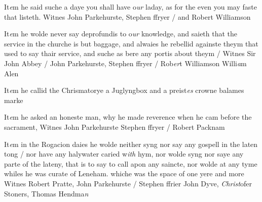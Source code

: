 \documentclass[12pt, a4paper]{book}
\begin{document}
		\ifthenelse{\isodd{\thepage}}
		{\reversemarginpar}
		{\normalmarginpar}
		It\textit{e}m he said suche a daye you shall have o\textit{ur} laday, as for the even
 	you may faste that listeth. Witnes John Parkehurste, Stephen
 		ffryer / and Robert Williamson
	
		
				\marginpar[\vspace{0.5cm}{\textcolor{Gray}{Anno 1542}}]{}
			
		
				\marginpar[\vspace{0.5cm}{\textcolor{Gray}{offensive}}]{}
			
	
		\ifthenelse{\isodd{\thepage}}
		{\reversemarginpar}
		{\normalmarginpar}
		It\textit{e}m he wolde never say deprofundis to o\textit{ur} knowledge, and saieth
  that the service in the churche is but baggage, and alwaies
 he rebellid againste theym that used to say thair service, and
 suche as bere any portis about theym / Witnes Sir John
 	Abbey / John Parkehurste, Stephen ffryer / Rob\textit{er}t Williamson
		Willi\textit{a}m Alen
	
 
				\marginpar[\vspace{0.5cm}{\textcolor{Gray}{Anno 1540}}]{}
			
	
				\marginpar[\vspace{0.5cm}{\textcolor{Gray}{seditious}}]{}
			
	
				\marginpar[\vspace{0.5cm}{\textcolor{Gray}{vi articles}}]{}
			
	
		\ifthenelse{\isodd{\thepage}}
		{\reversemarginpar}
		{\normalmarginpar}
		It\textit{e}m he callid the Chrismatorye a Juglyngbox and a preist\textit{es}
  crowne balames marke
  
		\ifthenelse{\isodd{\thepage}}
		{\reversemarginpar}
		{\normalmarginpar}
		It\textit{e}m he asked an honeste man, why he made reverence when
  	he cam before the sacrament, Witnes John Parkehurste
  	Stephen ffryer / Robert Packnam
	
 
 	
				\marginpar[\vspace{0.5cm}{\textcolor{Gray}{ceremonies}}]{}
			
	
		\ifthenelse{\isodd{\thepage}}
		{\reversemarginpar}
		{\normalmarginpar}
		It\textit{e}m in the Rogacion daies he wolde neither syng nor say any gospell
 in the laten tong / nor have any halywater caried w\textit{ith} hym, nor
 wolde syng nor saye any parte of the lateny, that is to say to
 call apon any saincte, nor wolde at any tyme whiles he was
		curate of Leneham. whiche was the space of one yere and more
		Witnes Robert Pratte, John Parkehurste / Stephen ffrier
		John Dyve, \textit{Christ}ofer Stoners, Thomas Hendma\textit{n}
	
\end{document}
